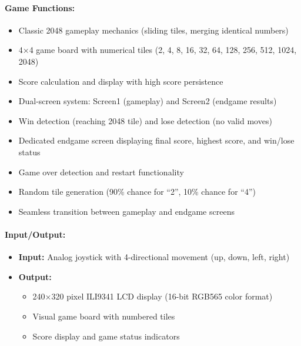 \documentclass[12pt,a4paper]{article}
\begin{document}
\paragraph{Game Functions:}
\begin{itemize}[leftmargin=*]
    \item Classic 2048 gameplay mechanics (sliding tiles, merging identical numbers)
    \item 4×4 game board with numerical tiles (2, 4, 8, 16, 32, 64, 128, 256, 512, 1024, 2048)
    \item Score calculation and display with high score persistence
    \item Dual-screen system: Screen1 (gameplay) and Screen2 (endgame results)
    \item Win detection (reaching 2048 tile) and lose detection (no valid moves)
    \item Dedicated endgame screen displaying final score, highest score, and win/lose status
    \item Game over detection and restart functionality
    \item Random tile generation (90\% chance for ``2'', 10\% chance for ``4'')
    \item Seamless transition between gameplay and endgame screens
\end{itemize}

\paragraph{Input/Output:}
\begin{itemize}[leftmargin=*]
    \item \textbf{Input:} Analog joystick with 4-directional movement (up, down, left, right)
    \item \textbf{Output:}
    \begin{itemize}
        \item 240×320 pixel ILI9341 LCD display (16-bit RGB565 color format)
        \item Visual game board with numbered tiles
        \item Score display and game status indicators
    \end{itemize}
\end{itemize}
\end{document}
